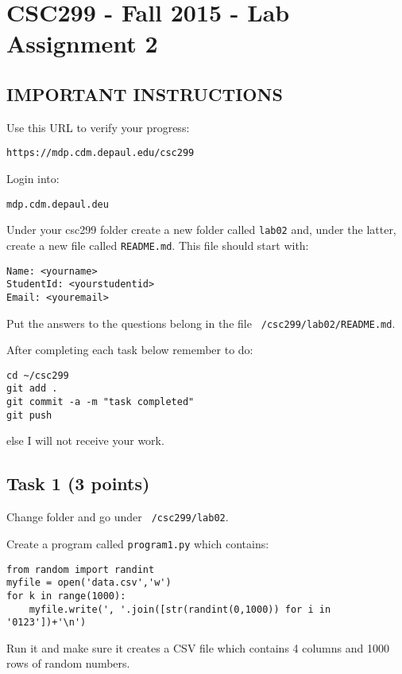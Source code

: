 \documentclass[12pt]{article}
\begin{document}
\section{CSC299 - Fall 2015 - Lab Assignment 2}

\subsection*{IMPORTANT INSTRUCTIONS}

Use this URL to verify your progress:
\begin{verbatim}
https://mdp.cdm.depaul.edu/csc299
\end{verbatim}

Login into:
\begin{verbatim}
mdp.cdm.depaul.deu
\end{verbatim}

Under your csc299 folder create a new folder called {\tt lab02} and, under the latter, create a new file called {\tt README.md}. This file should start with:

\begin{verbatim}
Name: <yourname>
StudentId: <yourstudentid>
Email: <youremail>
\end{verbatim}

Put the answers to the questions belong in the file
{\tt ~/csc299/lab02/README.md}.

After completing each task below remember to do:

\begin{verbatim}
cd ~/csc299
git add .
git commit -a -m "task completed"
git push
\end{verbatim}

else I will not receive your work.

\subsection{Task 1 (3 points)}

Change folder and go under {\tt ~/csc299/lab02}.

Create a program called {\tt program1.py} which contains:

\begin{verbatim}
from random import randint
myfile = open('data.csv','w')
for k in range(1000):
    myfile.write(', '.join([str(randint(0,1000)) for i in '0123'])+'\n')
\end{verbatim}

Run it and make sure it creates a CSV file which contains 4 columns and 1000 rows of random numbers.
\end{document}
